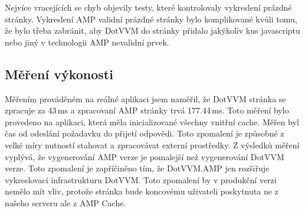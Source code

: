 Nejvíce vracejících se chyb objevily testy, které kontrolovaly vykreslení prázdné stránky. Vykreslení AMP validní prázdné stránky bylo komplikované kvůli tomu, že bylo třeba zabránit, aby DotVVM do stránky přidalo jakýkoliv kus javascriptu nebo jiný v technologii AMP nevalidní prvek.


\subsection*{Měření výkonosti}
Měřením prováděném na reálné aplikaci jsem naměřil, že DotVVM stránka se zpracuje za 43\,ms a zpracovaní AMP stránky trvá 177.44\,ms. Toto měření bylo provedeno na aplikaci, která měla inicializované všechny vnitřní cache. Měřen byl čas od odeslání požadavku do přijetí odpovědi.
Toto zpomalení je způsobné z velké míry nutností stahovat a zpracovávat externí prostředky.
Z výsledků měření vyplývá, že vygenerování AMP verze je pomalejší než vygenerování DotVVM verze. Toto zpomalení je zapříčiněno tím, že DotVVM.AMP jen rozšiřuje vykreslovací infrastrukturu DotVVM. Toto zpomalení by v produkční verzi nemělo mít vliv, protože stránka bude koncovému uživateli poskytnuta ne z našeho serveru ale z AMP Cache.
